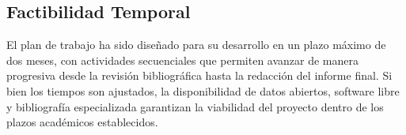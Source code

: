 \subsection{Factibilidad Temporal}
El plan de trabajo ha sido diseñado para su desarrollo en un plazo máximo de dos meses, con actividades secuenciales que permiten avanzar de manera progresiva desde la revisión bibliográfica hasta la redacción del informe final. Si bien los tiempos son ajustados, la disponibilidad de datos abiertos, software libre y bibliografía especializada garantizan la viabilidad del proyecto dentro de los plazos académicos establecidos.